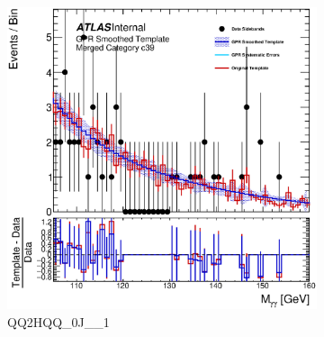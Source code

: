 \begin{figure}
\begin{center}
\begin{subfigure}[T]{0.49\linewidth}
	\centering
	\includegraphics[width=\linewidth]{figures/background/gpr/coupCatTemplates/GPR_Smoothed_Plot_hmgg_c39.eps}
	\caption{QQ2HQQ\_0J\_\_1}
\end{subfigure}
\begin{subfigure}[T]{0.49\linewidth}
	\centering

\end{subfigure}
\end{center}
\end{figure}
